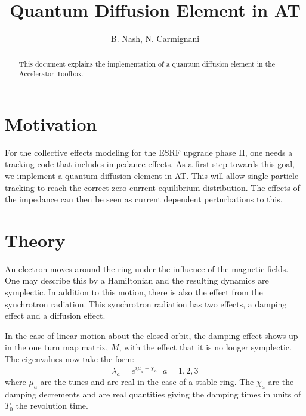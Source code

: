 \documentclass[a4paper,10pt]{article}
\title{Quantum Diffusion Element in AT}
\author{B. Nash, N. Carmignani}
\begin{document}
\maketitle

\begin{abstract}
This document explains the implementation of a quantum diffusion element in the Accelerator Toolbox.
\end{abstract}

\section{Motivation}
For the collective effects modeling for the ESRF upgrade phase II, one needs a tracking code that includes
impedance effects.  As a first step towards this goal, we implement a quantum diffusion element in AT.
This will allow single particle tracking to reach the correct zero current equilibrium distribution.  The effects of
the impedance can then be seen as current dependent perturbations to this.

\section{Theory} 

An electron moves around the ring under the influence of the magnetic fields.  One may describe this by
a Hamiltonian and the resulting dynamics are symplectic.  In addition to this motion, there is also the effect
from the synchrotron radiation.  This synchrotron radiation has two effects, a damping effect and a diffusion 
effect.

In the case of linear motion about the closed orbit, the damping effect shows up in the one turn map matrix, $M$,
with the effect that it is no longer symplectic.  The eigenvalues now take the form:
\begin{equation}
\lambda_a = e^{i\mu_a +\chi_a} \ \ \ a=1,2,3
\end{equation}
where $\mu_a$ are the tunes and are real in the case of a stable ring.  The $\chi_a$ are the damping decrements and are
real quantities giving the damping times in units of $T_0$ the revolution time.
\end{document}
